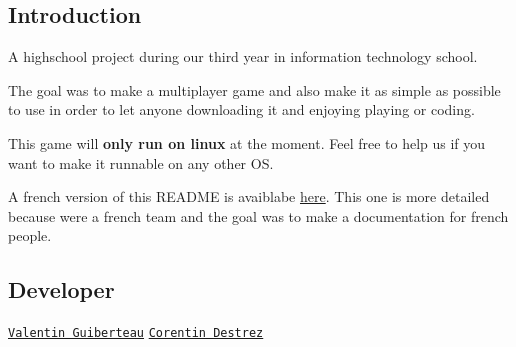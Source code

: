 

\subsection*{Introduction}

A highschool project during our third year in information technology school.

The goal was to make a multiplayer game and also make it as simple as possible to use in order to let anyone downloading it and enjoying playing or coding.

This game will {\bfseries only run on linux} at the moment. Feel free to help us if you want to make it runnable on any other OS.

A french version of this R\+E\+A\+D\+ME is avaiblabe \hyperlink{_r_e_a_d_m_e_8fr_8md}{here}. This one is more detailed because we\textquotesingle{}re a french team and the goal was to make a documentation for french people.

\subsection*{Developer}

\href{https://github.com/ValentinIG2I}{\tt Valentin Guiberteau} \href{https://github.com/Lafie-rage}{\tt Corentin Destrez}

 